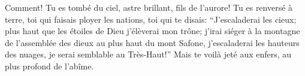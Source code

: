 Comment! Tu es tombé du ciel, astre brillant, fils de l’aurore!
	Tu es renversé à terre, toi qui faisais ployer les nations,
	toi qui te disais: “J’escaladerai les cieux;
	plus haut que les étoiles de Dieu j’élèverai mon trône;
	j’irai siéger à la montagne de l’assemblée des dieux au plus haut du mont Safone,
	j’escaladerai les hauteurs des nuages, je serai semblable au Très-Haut!”
Mais te voilà jeté aux enfers, au plus profond de l’abîme.

